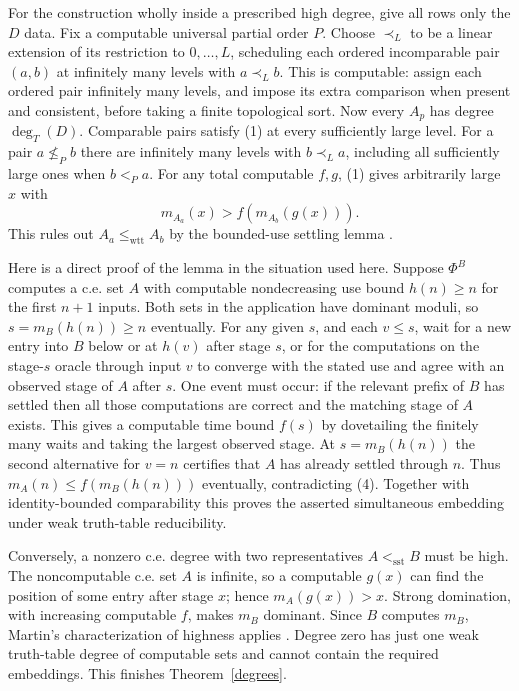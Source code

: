 \documentclass[11pt]{article}
\newcommand{\sst}{\mathrm{sst}}
\newcommand{\wtt}{\mathrm{wtt}}
\begin{document}
For the construction wholly inside a prescribed high degree, give all rows only the $D$ data. Fix a computable universal partial order $P$. Choose $\prec_L$ to be a linear extension of its restriction to $0,\ldots,L$, scheduling each ordered incomparable pair $(a,b)$ at infinitely many levels with $a\prec_L b$. This is computable: assign each ordered pair infinitely many levels, and impose its extra comparison when present and consistent, before taking a finite topological sort. Now every $A_p$ has degree $\deg_T(D)$. Comparable pairs satisfy (1) at every sufficiently large level. For a pair $a\not\le_P b$ there are infinitely many levels with $b\prec_L a$, including all sufficiently large ones when $b<_P a$. For any total computable $f,g$, (1) gives arbitrarily large $x$ with
\[
                        m_{A_a}(x)> f(m_{A_b}(g(x))).            \tag{4}
\]
This rules out $A_a\le_{\wtt}A_b$ by the bounded-use settling lemma \cite[Lemma 7.6]{cs}.

Here is a direct proof of the lemma in the situation used here. Suppose $\Phi^B$ computes a c.e. set $A$ with computable nondecreasing use bound $h(n)\ge n$ for the first $n+1$ inputs. Both sets in the application have dominant moduli, so $s=m_B(h(n))\ge n$ eventually. For any given $s$, and each $v\le s$, wait for a new entry into $B$ below or at $h(v)$ after stage $s$, or for the computations on the stage-$s$ oracle through input $v$ to converge with the stated use and agree with an observed stage of $A$ after $s$. One event must occur: if the relevant prefix of $B$ has settled then all those computations are correct and the matching stage of $A$ exists. This gives a computable time bound $f(s)$ by dovetailing the finitely many waits and taking the largest observed stage. At $s=m_B(h(n))$ the second alternative for $v=n$ certifies that $A$ has already settled through $n$. Thus $m_A(n)\le f(m_B(h(n)))$ eventually, contradicting (4). Together with identity-bounded comparability this proves the asserted simultaneous embedding under weak truth-table reducibility.

Conversely, a nonzero c.e. degree with two representatives $A<_{\sst}B$ must be high. The noncomputable c.e. set $A$ is infinite, so a computable $g(x)$ can find the position of some entry after stage $x$; hence $m_A(g(x))>x$. Strong domination, with increasing computable $f$, makes $m_B$ dominant. Since $B$ computes $m_B$, Martin's characterization of highness applies \cite{martin}. Degree zero has just one weak truth-table degree of computable sets and cannot contain the required embeddings. This finishes Theorem~\ref{degrees}.
\end{document}
